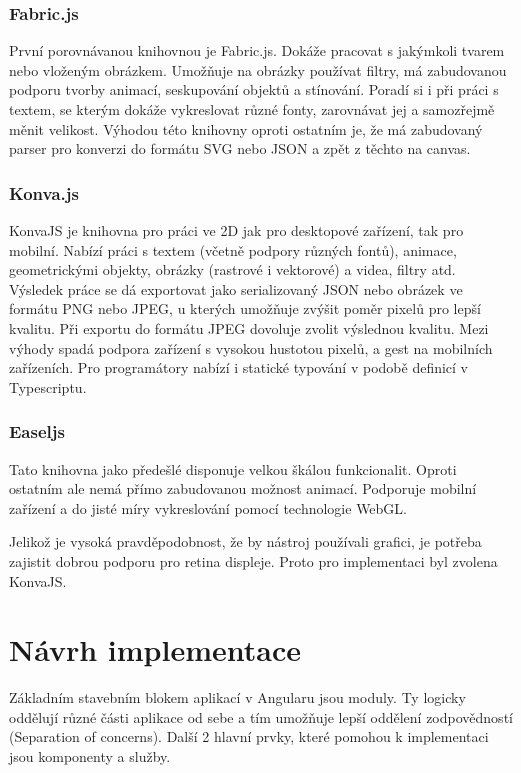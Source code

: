             \subsubsection{Fabric.js}
            První porovnávanou knihovnou je Fabric.js. Dokáže pracovat s jakýmkoli tvarem nebo vloženým obrázkem. Umožňuje na obrázky používat filtry,
            má zabudovanou podporu tvorby animací, seskupování objektů a stínování. Poradí si i při práci s textem, se kterým dokáže vykreslovat různé fonty,
            zarovnávat jej a samozřejmě měnit velikost.
            Výhodou této knihovny oproti ostatním je, že má zabudovaný parser pro konverzi do formátu SVG nebo JSON a zpět z těchto na canvas.  
            
            \subsubsection{Konva.js}
            KonvaJS je knihovna pro práci ve 2D jak pro desktopové zařízení, tak pro mobilní. Nabízí práci s textem (včetně podpory různých fontů),
            animace, geometrickými objekty, obrázky (rastrové i vektorové) a videa, filtry atd. Výsledek práce se dá exportovat jako serializovaný
            JSON nebo obrázek ve formátu PNG nebo JPEG, u kterých umožňuje zvýšit poměr pixelů pro lepší kvalitu.
            Při exportu do formátu JPEG dovoluje zvolit výslednou kvalitu. Mezi výhody spadá podpora zařízení s vysokou hustotou pixelů, a gest na mobilních zařízeních.
            Pro programátory nabízí i statické typování v podobě definicí v Typescriptu. 

            \subsubsection{Easeljs}
            Tato knihovna jako předešlé disponuje velkou škálou funkcionalit.
            Oproti ostatním ale nemá přímo zabudovanou možnost animací.
            Podporuje mobilní zařízení a do jisté míry vykreslování pomocí technologie WebGL.

            Jelikož je vysoká pravděpodobnost, že by nástroj používali grafici, je potřeba zajistit dobrou podporu pro retina displeje.
            Proto pro implementaci byl zvolena KonvaJS.

    \section{Návrh implementace}
    Základním stavebním blokem aplikací v Angularu jsou moduly. Ty logicky oddělují různé části aplikace od sebe a tím umožňuje lepší oddělení
     zodpovědností (Separation of concerns). Další 2 hlavní prvky, které pomohou k implementaci jsou komponenty a služby.  

